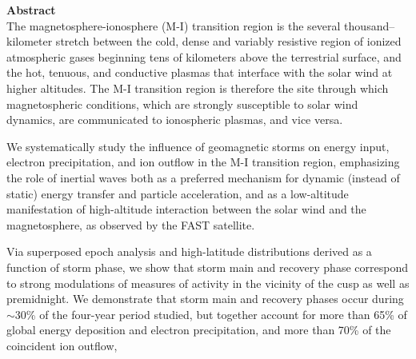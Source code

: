 
\vspace*{1in}
{\Huge \bf Abstract} \\

The magnetosphere-ionosphere (M-I) transition region is the several
thousand--kilometer stretch between the cold, dense and variably resistive
region of ionized atmospheric gases beginning tens of kilometers above the
terrestrial surface, and the hot, tenuous, and conductive plasmas that interface
with the solar wind at higher altitudes. The M-I transition region is therefore
the site through which magnetospheric conditions, which are strongly susceptible
to solar wind dynamics, are communicated to ionospheric plasmas, and vice versa.

We systematically study the influence of geomagnetic storms on energy input,
electron precipitation, and ion outflow in the M-I transition region,
emphasizing the role of inertial \Alf waves both as a preferred mechanism for
dynamic (instead of static) energy transfer and particle acceleration, and as a
low-altitude manifestation of high-altitude interaction between the solar wind
and the magnetosphere, as observed by the FAST satellite.

Via superposed epoch analysis and high-latitude distributions derived as a
function of storm phase, we show that storm main and recovery phase correspond
to strong modulations of measures of \Alfic activity in the vicinity of the cusp
as well as premidnight. We demonstrate that storm main and recovery phases occur
during $\sim$30\% of the four-year period studied, but together account for more
than 65\% of global \Alfic energy deposition and electron precipitation, and
more than 70\% of the coincident ion outflow,

